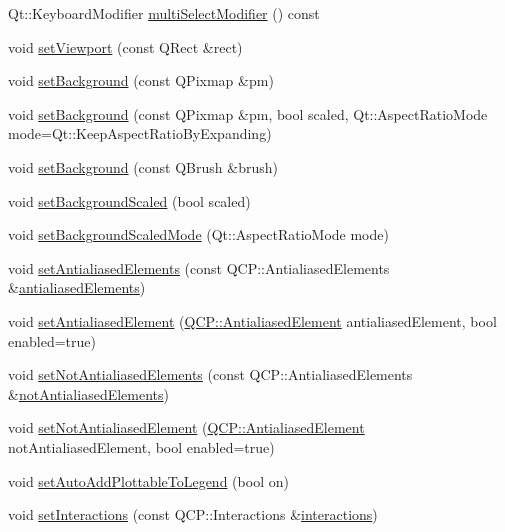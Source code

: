 \begin{DoxyCompactItemize}
Qt\-::\-Keyboard\-Modifier \hyperlink{class_q_custom_plot_a9b6b1a0fea8da3fda6d5e3d687202877}{multi\-Select\-Modifier} () const 
\item 
void \hyperlink{class_q_custom_plot_a3f9bc4b939dd8aaba9339fd09f273fc4}{set\-Viewport} (const Q\-Rect \&rect)
\item 
void \hyperlink{class_q_custom_plot_a130358592cfca353ff3cf5571b49fb00}{set\-Background} (const Q\-Pixmap \&pm)
\item 
void \hyperlink{class_q_custom_plot_a8513971d6aa24d8b0d6a68d45b542130}{set\-Background} (const Q\-Pixmap \&pm, bool scaled, Qt\-::\-Aspect\-Ratio\-Mode mode=Qt\-::\-Keep\-Aspect\-Ratio\-By\-Expanding)
\item 
void \hyperlink{class_q_custom_plot_a8ed256cf467bfa7ba1f9feaae62c3bd0}{set\-Background} (const Q\-Brush \&brush)
\item 
void \hyperlink{class_q_custom_plot_a36f0fa1317325dc7b7efea615ee2de1f}{set\-Background\-Scaled} (bool scaled)
\item 
void \hyperlink{class_q_custom_plot_a4c0eb4865b7949f62e1cb97db04a3de0}{set\-Background\-Scaled\-Mode} (Qt\-::\-Aspect\-Ratio\-Mode mode)
\item 
void \hyperlink{class_q_custom_plot_af6f91e5eab1be85f67c556e98c3745e8}{set\-Antialiased\-Elements} (const Q\-C\-P\-::\-Antialiased\-Elements \&\hyperlink{class_q_custom_plot_a81e954fbb485bb44c609e5707f0067b3}{antialiased\-Elements})
\item 
void \hyperlink{class_q_custom_plot_aeef813bcf7efab8e765f9f87ec454691}{set\-Antialiased\-Element} (\hyperlink{namespace_q_c_p_ae55dbe315d41fe80f29ba88100843a0c}{Q\-C\-P\-::\-Antialiased\-Element} antialiased\-Element, bool enabled=true)
\item 
void \hyperlink{class_q_custom_plot_ae10d685b5eabea2999fb8775ca173c24}{set\-Not\-Antialiased\-Elements} (const Q\-C\-P\-::\-Antialiased\-Elements \&\hyperlink{class_q_custom_plot_a8060cee59757213764382a78d3196189}{not\-Antialiased\-Elements})
\item 
void \hyperlink{class_q_custom_plot_afc657938a707c890e449ae89203a076d}{set\-Not\-Antialiased\-Element} (\hyperlink{namespace_q_c_p_ae55dbe315d41fe80f29ba88100843a0c}{Q\-C\-P\-::\-Antialiased\-Element} not\-Antialiased\-Element, bool enabled=true)
\item 
void \hyperlink{class_q_custom_plot_ad8858410c2db47b7104040a3aa61c3fc}{set\-Auto\-Add\-Plottable\-To\-Legend} (bool on)
\item 
void \hyperlink{class_q_custom_plot_a5ee1e2f6ae27419deca53e75907c27e5}{set\-Interactions} (const Q\-C\-P\-::\-Interactions \&\hyperlink{class_q_custom_plot_a12401c02b6949a717f5749bb28c62983}{interactions})

\end{DoxyCompactItemize}
